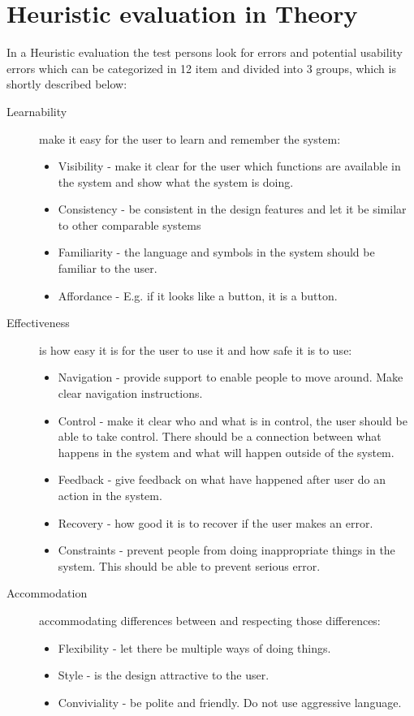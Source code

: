 \section{Heuristic evaluation in Theory}
In a Heuristic evaluation the test persons look for errors and potential usability errors which can be categorized in 12 item and divided into 3 groups\citep{DIEB}, which is shortly described below:
\begin{description}
\item[Learnability] make it easy for the user to learn and remember the system:
\begin{itemize}
	\item Visibility - make it clear for the user which functions are available in the system and show what the system is doing.
	\item Consistency - be consistent in the design features and let it be similar to other comparable systems
	\item Familiarity - the language and symbols in the system should be familiar to the user.
	\item Affordance -  E.g. if it looks like a button, it is a button. 
\end{itemize}

\item[Effectiveness] is how easy it is for the user to use it and how safe it is to use:
\begin{itemize}
	\item Navigation - provide support to enable people to move around. Make clear navigation instructions.
	\item Control - make it clear who and what is in control, the user should be able to take control. There should be a connection between what happens in the system and what will happen outside of the system. 
	\item Feedback - give feedback on what have happened after user do an action in the system.
	\item Recovery - how good it is to recover if the user makes an error. 
	\item Constraints - prevent people from doing inappropriate things in the system. This should be able to prevent serious error.
\end{itemize}

\item[Accommodation] accommodating differences between and respecting those differences:
\begin{itemize}
	\item Flexibility - let there be multiple ways of doing things.
	\item Style - is the design attractive to the user. 
	\item Conviviality - be polite and friendly. Do not use aggressive language.
\end{itemize}
\end{description}

